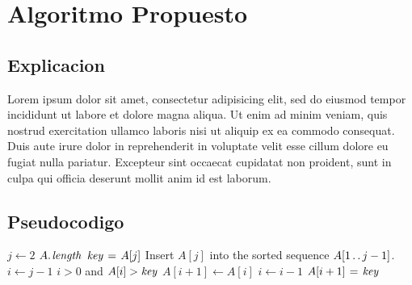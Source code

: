 \newpage
\section{Algoritmo Propuesto}\label{sec:algoritmo}
\subsection{Explicacion}

Lorem ipsum dolor sit amet, consectetur adipisicing elit, sed do eiusmod
tempor incididunt ut labore et dolore magna aliqua. Ut enim ad minim veniam,
quis nostrud exercitation ullamco laboris nisi ut aliquip ex ea commodo
consequat. Duis aute irure dolor in reprehenderit in voluptate velit esse
cillum dolore eu fugiat nulla pariatur. Excepteur sint occaecat cupidatat non
proident, sunt in culpa qui officia deserunt mollit anim id est laborum.

\subsection{Pseudocodigo}

\begin{codebox}
\li \For $j \gets 2$ \To $\attrib{A}{length}$
\li \Do
$\id{key} \gets A[j]$
\li \Comment Insert $A[j]$ into the sorted sequence
$A[1 \mathinner{\ldotp\ldotp} j-1]$.
\li $i \gets j-1$
\li \While $i > 0$ and $A[i] > \id{key}$
\li \Do
$A[i+1] \gets A[i]$
\li $i \gets i-1$
\End
\li $A[i+1] \gets \id{key}$
\End
\end{codebox}